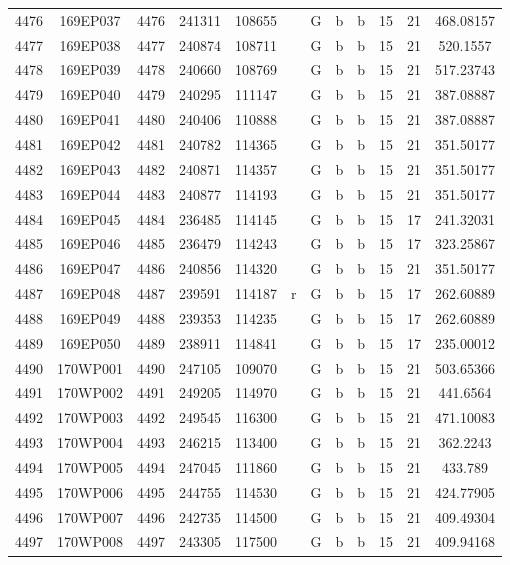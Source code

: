 \begin{tabular}{|*{12}{c|}}
4476 & 169EP037 & 4476 & 241311 & 108655 &  & G & b & b & 15 & 21 & 468.08157 \\ 
4477 & 169EP038 & 4477 & 240874 & 108711 &  & G & b & b & 15 & 21 & 520.1557 \\ 
4478 & 169EP039 & 4478 & 240660 & 108769 &  & G & b & b & 15 & 21 & 517.23743 \\ 
4479 & 169EP040 & 4479 & 240295 & 111147 &  & G & b & b & 15 & 21 & 387.08887 \\ 
4480 & 169EP041 & 4480 & 240406 & 110888 &  & G & b & b & 15 & 21 & 387.08887 \\ 
4481 & 169EP042 & 4481 & 240782 & 114365 &  & G & b & b & 15 & 21 & 351.50177 \\ 
4482 & 169EP043 & 4482 & 240871 & 114357 &  & G & b & b & 15 & 21 & 351.50177 \\ 
4483 & 169EP044 & 4483 & 240877 & 114193 &  & G & b & b & 15 & 21 & 351.50177 \\ 
4484 & 169EP045 & 4484 & 236485 & 114145 &  & G & b & b & 15 & 17 & 241.32031 \\ 
4485 & 169EP046 & 4485 & 236479 & 114243 &  & G & b & b & 15 & 17 & 323.25867 \\ 
4486 & 169EP047 & 4486 & 240856 & 114320 &  & G & b & b & 15 & 21 & 351.50177 \\ 
4487 & 169EP048 & 4487 & 239591 & 114187 & r & G & b & b & 15 & 17 & 262.60889 \\ 
4488 & 169EP049 & 4488 & 239353 & 114235 &  & G & b & b & 15 & 17 & 262.60889 \\ 
4489 & 169EP050 & 4489 & 238911 & 114841 &  & G & b & b & 15 & 17 & 235.00012 \\ 
4490 & 170WP001 & 4490 & 247105 & 109070 &  & G & b & b & 15 & 21 & 503.65366 \\ 
4491 & 170WP002 & 4491 & 249205 & 114970 &  & G & b & b & 15 & 21 & 441.6564 \\ 
4492 & 170WP003 & 4492 & 249545 & 116300 &  & G & b & b & 15 & 21 & 471.10083 \\ 
4493 & 170WP004 & 4493 & 246215 & 113400 &  & G & b & b & 15 & 21 & 362.2243 \\ 
4494 & 170WP005 & 4494 & 247045 & 111860 &  & G & b & b & 15 & 21 & 433.789 \\ 
4495 & 170WP006 & 4495 & 244755 & 114530 &  & G & b & b & 15 & 21 & 424.77905 \\ 
4496 & 170WP007 & 4496 & 242735 & 114500 &  & G & b & b & 15 & 21 & 409.49304 \\ 
4497 & 170WP008 & 4497 & 243305 & 117500 &  & G & b & b & 15 & 21 & 409.94168 \\ 

\end{tabular}
